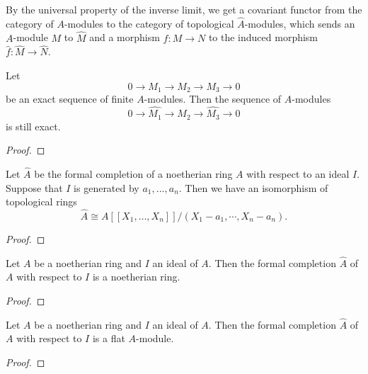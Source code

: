 
    By the universal property of the inverse limit, 
    we get a covariant functor from the category of \(A\)-modules to the category of topological \(\widehat{A}\)-modules, 
    which sends an \(A\)-module \(M\) to \(\widehat{M}\) and a morphism \(f: M \to N\) to the induced morphism \(\widehat{f}: \widehat{M} \to \widehat{N}\).

    \begin{lemma}\label{lem: completion is exact}
        Let 
        \[ 0 \to M_1 \to M_2 \to M_3 \to 0 \]
        be an exact sequence of finite \(A\)-modules.
        Then the sequence of \(\widehat{A}\)-modules
        \[ 0 \to \widehat{M_1} \to \widehat{M_2} \to \widehat{M_3} \to 0 \]
        is still exact.
    \end{lemma}
    \begin{proof}
    \end{proof}


    \begin{lemma}\label{lem: completion is isomorphic to image of power series}
        Let \(\widehat{A}\) be the formal completion of a noetherian ring \(A\) with respect to an ideal \(I\). 
        Suppose that \(I\) is generated by \(a_1,...,a_n\). 
        Then we have an isomorphism of topological rings
        \[ \widehat{A} \cong A[[X_1, \ldots, X_n]]/(X_1-a_1, \cdots, X_n-a_n). \]
    \end{lemma}
    \begin{proof}
    \end{proof}

    \begin{proposition}\label{prop: completion is noetherian}
        Let \(A\) be a noetherian ring and \(I\) an ideal of \(A\). 
        Then the formal completion \(\widehat{A}\) of \(A\) with respect to \(I\) is a noetherian ring.
    \end{proposition}
    \begin{proof}
    \end{proof}

    \begin{proposition}\label{prop: completion is flat}
        Let \(A\) be a noetherian ring and \(I\) an ideal of \(A\). 
        Then the formal completion \(\widehat{A}\) of \(A\) with respect to \(I\) is a flat \(A\)-module.
    \end{proposition}
    \begin{proof}
    \end{proof}

